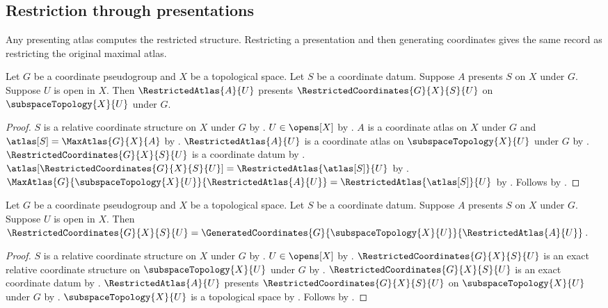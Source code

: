 \subsection{Restriction through presentations}

Any presenting atlas computes the restricted structure. Restricting a
presentation and then generating coordinates gives the same record as
restricting the original maximal atlas.

\begin{theorem}\label{restricted_coordinates_presentation}
    Let $G$ be a coordinate pseudogroup and $X$ be a topological space.
    Let $S$ be a coordinate datum.
    Suppose $A$ presents $S$ on $X$ under $G$.
    Suppose $U$ is open in $X$.
    Then $\RestrictedAtlas{A}{U}$ presents $\RestrictedCoordinates{G}{X}{S}{U}$
        on $\subspaceTopology{X}{U}$ under $G$.
\end{theorem}
\begin{proof}
    $S$ is a relative coordinate structure on $X$ under $G$ by .
    $U\in\opens[X]$ by .
    $A$ is a coordinate atlas on $X$ under $G$ and $\atlas[S]=\MaxAtlas{G}{X}{A}$ by
        .
    $\RestrictedAtlas{A}{U}$ is a coordinate atlas on $\subspaceTopology{X}{U}$ under $G$ by
        .
    $\RestrictedCoordinates{G}{X}{S}{U}$ is a coordinate datum by
        .
    $\atlas[\RestrictedCoordinates{G}{X}{S}{U}]=\RestrictedAtlas{\atlas[S]}{U}$ by
        .
    $\MaxAtlas{G}{\subspaceTopology{X}{U}}{\RestrictedAtlas{A}{U}}
        =\RestrictedAtlas{\atlas[S]}{U}$ by .
    Follows by .
\end{proof}

\begin{theorem}\label{restricted_coordinates_from_presentation}
    Let $G$ be a coordinate pseudogroup and $X$ be a topological space.
    Let $S$ be a coordinate datum.
    Suppose $A$ presents $S$ on $X$ under $G$.
    Suppose $U$ is open in $X$.
    Then $\RestrictedCoordinates{G}{X}{S}{U}
        =\GeneratedCoordinates{G}{\subspaceTopology{X}{U}}{\RestrictedAtlas{A}{U}}$.
\end{theorem}
\begin{proof}
    $S$ is a relative coordinate structure on $X$ under $G$ by .
    $U\in\opens[X]$ by .
    $\RestrictedCoordinates{G}{X}{S}{U}$ is an exact relative coordinate structure
        on $\subspaceTopology{X}{U}$ under $G$ by .
    $\RestrictedCoordinates{G}{X}{S}{U}$ is an exact coordinate datum by
        .
    $\RestrictedAtlas{A}{U}$ presents $\RestrictedCoordinates{G}{X}{S}{U}$
        on $\subspaceTopology{X}{U}$ under $G$ by .
    $\subspaceTopology{X}{U}$ is a topological space by .
    Follows by .
\end{proof}

